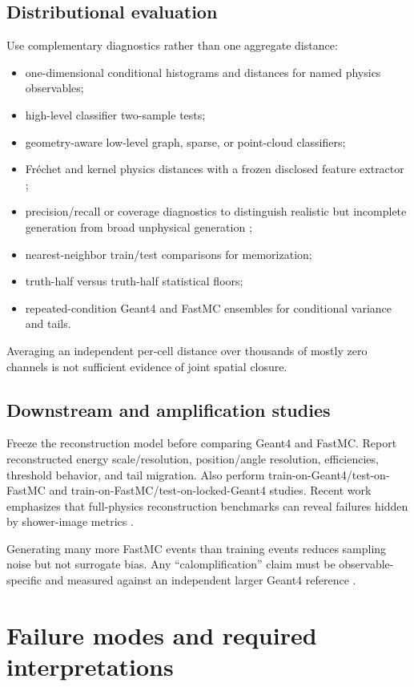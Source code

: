 \documentclass[11pt]{article}
\theoremstyle{definition}
\theoremstyle{remark}
\begin{document}
\subsection{Distributional evaluation}
Use complementary diagnostics rather than one aggregate distance:
\begin{itemize}[leftmargin=2em]
  \item one-dimensional conditional histograms and distances for named physics observables;
  \item high-level classifier two-sample tests;
  \item geometry-aware low-level graph, sparse, or point-cloud classifiers;
  \item Fr\'echet and kernel physics distances with a frozen disclosed feature extractor \citep{hepgenerative_metrics};
  \item precision/recall or coverage diagnostics to distinguish realistic but incomplete generation from broad unphysical generation \citep{precisionrecall,improvedpr};
  \item nearest-neighbor train/test comparisons for memorization;
  \item truth-half versus truth-half statistical floors;
  \item repeated-condition Geant4 and FastMC ensembles for conditional variance and tails.
\end{itemize}
Averaging an independent per-cell distance over thousands of mostly zero channels is not sufficient evidence of joint spatial closure.

\subsection{Downstream and amplification studies}
Freeze the reconstruction model before comparing Geant4 and FastMC. Report reconstructed energy scale/resolution, position/angle resolution, efficiencies, threshold behavior, and tail migration. Also perform train-on-Geant4/test-on-FastMC and train-on-FastMC/test-on-locked-Geant4 studies. Recent work emphasizes that full-physics reconstruction benchmarks can reveal failures hidden by shower-image metrics \citep{fullphysicsbenchmark}.

Generating many more FastMC events than training events reduces sampling noise but not surrogate bias. Any ``calomplification'' claim must be observable-specific and measured against an independent larger Geant4 reference \citep{calomplification}.

\section{Failure modes and required interpretations}
\end{document}
